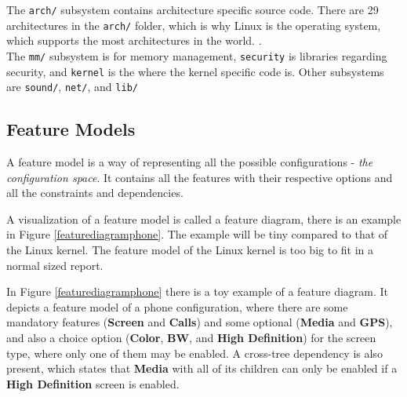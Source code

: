 \documentclass[a4paper,11pt]{report}
\newcommand{\figa}{
    \begin{figure}[!htpb]
    \centering
}
\newcommand{\figb}[2]{
    \caption{#1}
    \label{#2}
    \end{figure}
}
\begin{document}
The \texttt{arch/} subsystem contains architecture specific source code. 
There are 29 architectures in the \texttt{arch/} folder, which is why Linux is 
the operating system, which supports the most architectures in the world.
    \cite{22thbirthday}
.
\\

The \texttt{mm/} subsystem is for memory management, \texttt{security} is 
libraries regarding security, and \texttt{kernel} is the where the kernel 
specific code is. Other subsystems are \texttt{sound/}, \texttt{net/}, and 
\texttt{lib/}

        \subsection{Feature Models}

A feature model is a way of representing all the possible configurations - 
\emph{the configuration space}. It contains all the features with their 
respective options and all the constraints and dependencies.

A visualization of a feature model is called a feature diagram, there is an 
example in Figure \ref{featurediagramphone}. The example 
will be tiny compared to that of the Linux kernel. The feature model of the 
Linux kernel is too big to fit in a normal sized report.

In Figure \ref{featurediagramphone} there is a toy example of a feature 
diagram. It depicts a feature model of a phone configuration, where there are 
some mandatory features (\textbf{Screen} and \textbf{Calls}) and some optional 
(\textbf{Media} and \textbf{GPS}), 
and also a choice option (\textbf{Color}, \textbf{BW}, and \textbf{High 
Definition}) for the screen type, where only one of them may be enabled. A 
cross-tree dependency is also present, which states that \textbf{Media} with 
all of its children can only be enabled if a \textbf{High Definition} screen is 
enabled.
\end{document}
